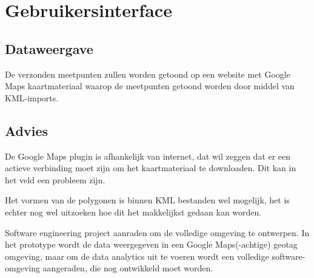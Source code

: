 \section{Gebruikersinterface}
\subsection{Dataweergave}
De verzonden meetpunten zullen worden getoond op een website met Google Maps
kaartmateriaal waarop de meetpunten getoond worden door middel van KML-imports.

\subsection{Advies}
De Google Maps plugin is afhankelijk van internet, dat wil zeggen dat er een actieve
verbinding moet zijn om het kaartmateriaal te downloaden. Dit kan in het veld een
probleem zijn.

Het vormen van de polygonen is binnen KML bestanden wel mogelijk, het is echter nog
wel uitzoeken hoe dit het makkelijkst gedaan kan worden.

Software engineering project aanraden om de volledige omgeving te ontwerpen. In het prototype wordt de data weergegeven in een Google Maps(-achtige) geotag omgeving, maar om de data analytics uit te voeren wordt een volledige software-omgeving aangeraden, die nog ontwikkeld moet worden.
